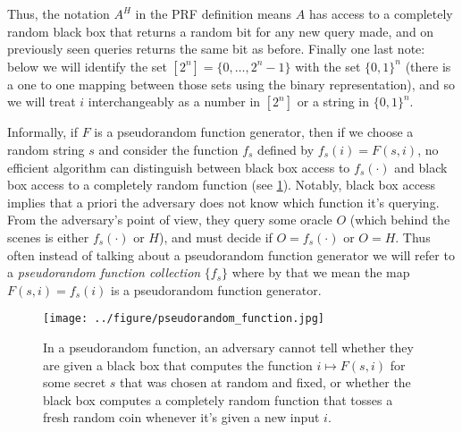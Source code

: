 
Thus, the notation \(A^H\) in the PRF definition means \(A\) has access
to a completely random black box that returns a random bit for any new
query made, and on previously seen queries returns the same bit as
before. Finally one last note: below we will identify the set
\([2^n] = \{0,\ldots,2^n-1\}\) with the set \(\{0,1\}^n\) (there is a
one to one mapping between those sets using the binary representation),
and so we will treat \(i\) interchangeably as a number in \([2^n]\) or a
string in \(\{0,1\}^n\).

Informally, if \(F\) is a pseudorandom function generator, then if we
choose a random string \(s\) and consider the function \(f_s\) defined
by \(f_s(i) = F(s,i)\), no efficient algorithm can distinguish between
black box access to \(f_s(\cdot)\) and black box access to a completely
random function (see \cref{prfmodelfig}). Notably, black box access
implies that a priori the adversary does not know which function it's
querying. From the adversary's point of view, they query some oracle
\(O\) (which behind the scenes is either \(f_s(\cdot)\) or \(H\)), and
must decide if \(O = f_s(\cdot)\) or \(O = H\). Thus often instead of
talking about a pseudorandom function generator we will refer to a
\emph{pseudorandom function collection} \(\{ f_s \}\) where by that we
mean the map \(F(s,i)=f_s(i)\) is a pseudorandom function generator.


\begin{figure}
\centering
\texttt{[image: ../figure/pseudorandom\_function.jpg]}
\caption{In a pseudorandom function, an adversary cannot tell whether
they are given a black box that computes the function
\(i \mapsto F(s,i)\) for some secret \(s\) that was chosen at random and
fixed, or whether the black box computes a completely random function
that tosses a fresh random coin whenever it's given a new input \(i\).}
\label{prfmodelfig}
\end{figure}

